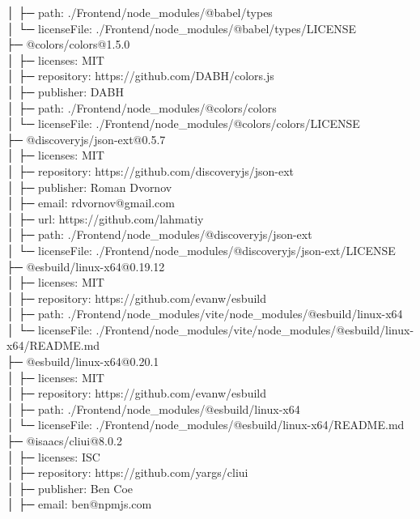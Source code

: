 │  ├─ path: ./Frontend/node\_modules/@babel/types\\
│  └─ licenseFile: ./Frontend/node\_modules/@babel/types/LICENSE\\
├─ @colors/colors@1.5.0\\
│  ├─ licenses: MIT\\
│  ├─ repository: https://github.com/DABH/colors.js\\
│  ├─ publisher: DABH\\
│  ├─ path: ./Frontend/node\_modules/@colors/colors\\
│  └─ licenseFile: ./Frontend/node\_modules/@colors/colors/LICENSE\\
├─ @discoveryjs/json-ext@0.5.7\\
│  ├─ licenses: MIT\\
│  ├─ repository: https://github.com/discoveryjs/json-ext\\
│  ├─ publisher: Roman Dvornov\\
│  ├─ email: rdvornov@gmail.com\\
│  ├─ url: https://github.com/lahmatiy\\
│  ├─ path: ./Frontend/node\_modules/@discoveryjs/json-ext\\
│  └─ licenseFile: ./Frontend/node\_modules/@discoveryjs/json-ext/LICENSE\\
├─ @esbuild/linux-x64@0.19.12\\
│  ├─ licenses: MIT\\
│  ├─ repository: https://github.com/evanw/esbuild\\
│  ├─ path: ./Frontend/node\_modules/vite/node\_modules/@esbuild/linux-x64\\
│  └─ licenseFile: ./Frontend/node\_modules/vite/node\_modules/@esbuild/linux-x64/README.md\\
├─ @esbuild/linux-x64@0.20.1\\
│  ├─ licenses: MIT\\
│  ├─ repository: https://github.com/evanw/esbuild\\
│  ├─ path: ./Frontend/node\_modules/@esbuild/linux-x64\\
│  └─ licenseFile: ./Frontend/node\_modules/@esbuild/linux-x64/README.md\\
├─ @isaacs/cliui@8.0.2\\
│  ├─ licenses: ISC\\
│  ├─ repository: https://github.com/yargs/cliui\\
│  ├─ publisher: Ben Coe\\
│  ├─ email: ben@npmjs.com\\
